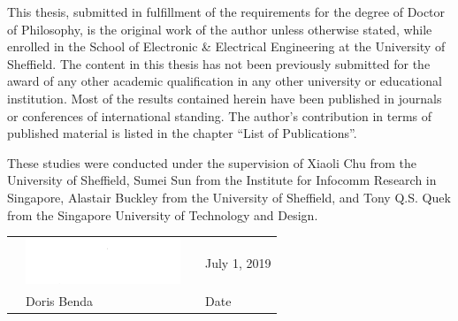 \clearpage
{}

\begin{Statement_of_Originality}
This thesis, submitted in fulfillment of the requirements for the degree of Doctor of Philosophy, is the original work of the author unless otherwise stated, while enrolled in the School of Electronic \& Electrical Engineering at the University of Sheffield. The content in this thesis has not been previously submitted for the award of any other academic qualification in any other university or educational institution. Most of the results contained herein have been published in journals or conferences of international standing. The author's contribution in terms of published material is listed in the chapter “List of Publications”. 

These studies were conducted under the supervision of Xiaoli Chu from the University of Sheffield, Sumei Sun from the Institute for Infocomm Research in Singapore, Alastair Buckley from the University of Sheffield, and Tony Q.S. Quek from the Singapore University of Technology and Design.



\vspace{11cm}
\begin{tabular}{@{}p{.01in}p{2in}p{1.2in}p{2in}@{}}

&\includegraphics{pictures/sign.PNG}& &July 1, 2019\\ \cline{2-2} \cline {4-4}
& Doris Benda& &Date
\end{tabular}


\end{Statement_of_Originality}

